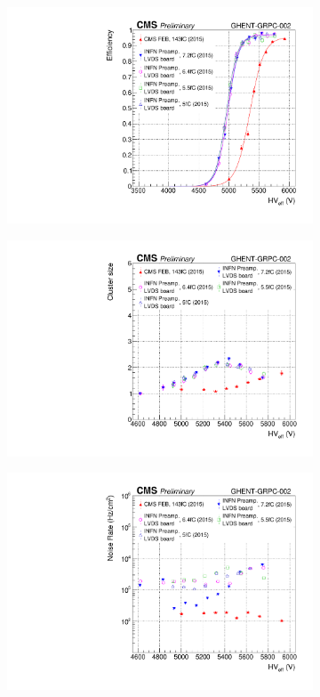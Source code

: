 \newpage
    
    \begin{figure}[H]
		\begin{subfigure}{.5\linewidth}
		    \centering
			\includegraphics[width=\linewidth]{fig/chapt6/gRPC-INFN-LVDS-Eff-Shift.pdf}
			\caption{\label{fig:INFN-gRPC:A}}
		\end{subfigure}
		\begin{subfigure}{.5\linewidth}
		    \centering
			\includegraphics[width = \linewidth]{fig/chapt6/gRPC-INFN-LVDS-ClS-Shift.pdf}
			\caption{\label{fig:INFN-gRPC:B}}
		\end{subfigure}
		\begin{subfigure}{\linewidth}
		    \centering
			\includegraphics[width = .5\linewidth]{fig/chapt6/gRPC-INFN-LVDS-Rate-Shift.pdf}

\end{subfigure}
\end{figure}
